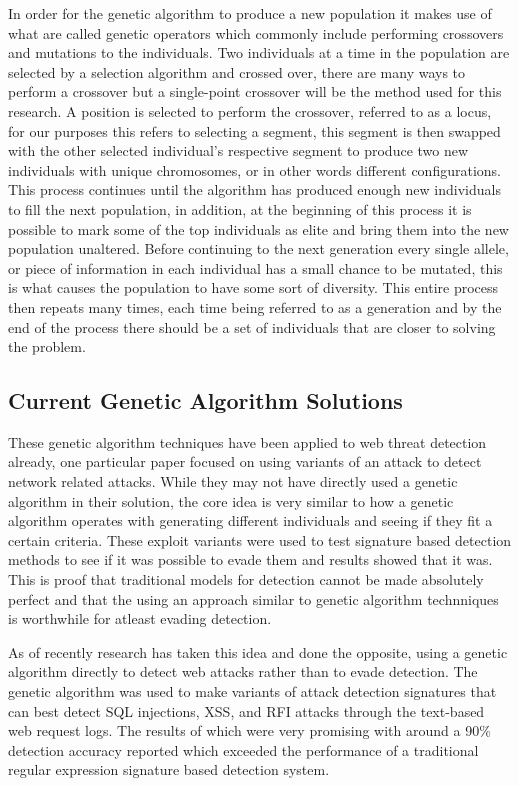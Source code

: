 In order for the genetic algorithm to produce a new population it makes use of what are called genetic operators which commonly include performing crossovers and mutations to the individuals.  Two individuals at a time in the population are selected by a selection algorithm and crossed over, there are many ways to perform a crossover but a single-point crossover will be the method used for this research.  A position is selected to perform the crossover, referred to as a locus, for our purposes this refers to selecting a segment, this segment is then swapped with the other selected individual's respective segment to produce two new individuals with unique chromosomes, or in other words different configurations.  This process continues until the algorithm has produced enough new individuals to fill the next population, in addition, at the beginning of this process it is possible to mark some of the top individuals as elite and bring them into the new population unaltered.  Before continuing to the next generation every single allele, or piece of information in each individual has a small chance to be mutated, this is what causes the population to have some sort of diversity.  This entire process then repeats many times, each time being referred to as a generation and by the end of the process there should be a set of individuals that are closer to solving the problem.

\subsection{Current Genetic Algorithm Solutions} \label{sec:currentGenSolutions}

These genetic algorithm techniques have been applied to web threat detection already, one particular paper focused on using variants of an attack to detect network related attacks.  While they may not have directly used a genetic algorithm in their solution, the core idea is very similar to how a genetic algorithm operates with generating different individuals and seeing if they fit a certain criteria.  These exploit variants were used to test signature based detection methods to see if it was possible to evade them and results showed that it was.  This is proof that traditional models for detection cannot be made absolutely perfect and that the using an approach similar to genetic algorithm technniques is worthwhile for atleast evading detection. \cite{testingNetworkBased}

As of recently research has taken this idea and done the opposite, using a genetic algorithm directly to detect web attacks rather than to evade detection.  The genetic algorithm was used to make variants of attack detection signatures that can best detect SQL injections, XSS, and RFI attacks through the text-based web request logs.  The results of which were very promising with around a 90\% detection accuracy reported which exceeded the performance of a traditional regular expression signature based detection system. \cite{mainPaper}


